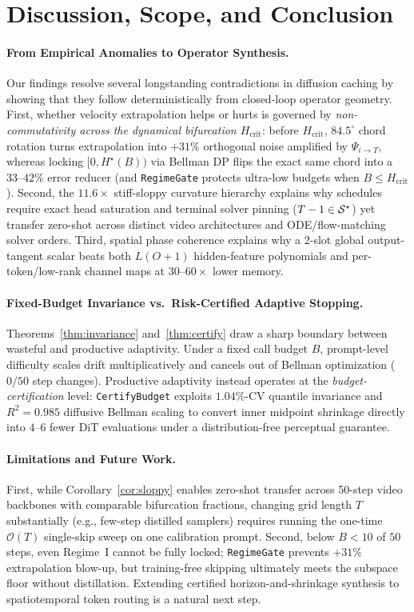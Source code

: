 \section{Discussion, Scope, and Conclusion}
\label{sec:discussion}

\paragraph{From Empirical Anomalies to Operator Synthesis.}
Our findings resolve several longstanding contradictions in diffusion caching by showing that they follow deterministically from closed-loop operator geometry. First, whether velocity extrapolation helps or hurts is governed by \emph{non-commutativity across the dynamical bifurcation $H_{\mathrm{crit}}$}: before $H_{\mathrm{crit}}$, $84.5^\circ$ chord rotation turns extrapolation into $+31\%$ orthogonal noise amplified by $\Psi_{i\to T}$, whereas locking $[0, H^\star(B))$ via Bellman DP flips the exact same chord into a $33\text{--}42\%$ error reducer (and \texttt{RegimeGate} protects ultra-low budgets when $B \le H_{\mathrm{crit}}$). Second, the $11.6\times$ stiff-sloppy curvature hierarchy explains why schedules require exact head saturation and terminal solver pinning ($T-1 \in \mathcal{S}^\star$) yet transfer zero-shot across distinct video architectures and ODE/flow-matching solver orders. Third, spatial phase coherence explains why a 2-slot global output-tangent scalar beats both $L(O{+}1)$ hidden-feature polynomials and per-token/low-rank channel maps at $30\text{--}60\times$ lower memory.

\paragraph{Fixed-Budget Invariance vs.\ Risk-Certified Adaptive Stopping.}
Theorems~\ref{thm:invariance} and~\ref{thm:certify} draw a sharp boundary between wasteful and productive adaptivity. Under a fixed call budget $B$, prompt-level difficulty scales drift multiplicatively and cancels out of Bellman optimization ($0/50$ step changes). Productive adaptivity instead operates at the \emph{budget-certification} level: \texttt{CertifyBudget} exploits $1.04\%$-CV quantile invariance and $R^2=0.985$ diffusive Bellman scaling to convert inner midpoint shrinkage directly into $4\text{--}6$ fewer DiT evaluations under a distribution-free perceptual guarantee.

\paragraph{Limitations and Future Work.}
First, while Corollary~\ref{cor:sloppy} enables zero-shot transfer across 50-step video backbones with comparable bifurcation fractions, changing grid length $T$ substantially (e.g., few-step distilled samplers) requires running the one-time $\mathcal{O}(T)$ single-skip sweep on one calibration prompt. Second, below $B < 10$ of $50$ steps, even Regime~I cannot be fully locked; \texttt{RegimeGate} prevents $+31\%$ extrapolation blow-up, but training-free skipping ultimately meets the subspace floor without distillation. Extending certified horizon-and-shrinkage synthesis to spatiotemporal token routing \citep{zou2024toca,feng2026worldcache} is a natural next step.
